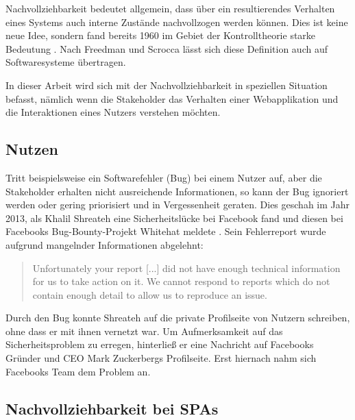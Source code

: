 Nachvollziehbarkeit bedeutet allgemein, dass über ein resultierendes Verhalten eines Systems auch interne Zustände nachvollzogen werden können. Dies ist keine neue Idee, sondern fand bereits 1960 im Gebiet der Kontrolltheorie starke Bedeutung \cite{OnTheGeneralTheoryOfControlSystems}. Nach Freedman \cite{TestabilityOfSoftwareComponents} und Scrocca \etal \cite{EnablingEventDrivenObservability} lässt sich diese Definition auch auf Softwaresysteme übertragen.
	
In dieser Arbeit wird sich mit der Nachvollziehbarkeit in speziellen Situation befasst, nämlich wenn die Stakeholder das Verhalten einer Webapplikation und die Interaktionen eines Nutzers verstehen möchten.%
	
\subsection{Nutzen}
	
Tritt beispielsweise ein Softwarefehler (Bug) bei einem Nutzer auf, aber die Stakeholder erhalten nicht ausreichende Informationen, so kann der Bug ignoriert werden oder gering priorisiert und in Vergessenheit geraten. Dies geschah im Jahr 2013, als Khalil Shreateh eine Sicherheitslücke bei Facebook fand und diesen bei Facebooks Bug-Bounty-Projekt Whitehat meldete \cite{FacebookBugBounyHunt}. Sein Fehlerreport wurde aufgrund mangelnder Informationen abgelehnt:
	
\begin{quotation}
Unfortunately your report [...] did not have enough technical information for us to take action  on  it. We  cannot  respond  to  reports  which  do  not contain enough detail to allow us to reproduce an issue.
\end{quotation}
	
Durch den Bug konnte Shreateh auf die private Profilseite von Nutzern schreiben, ohne dass er mit ihnen vernetzt war. Um Aufmerksamkeit auf das Sicherheitsproblem zu erregen, hinterließ er eine Nachricht auf Facebooks Gründer und CEO Mark Zuckerbergs Profilseite. Erst hiernach nahm sich Facebooks Team dem Problem an.
	
\subsection{Nachvollziehbarkeit bei SPAs}
	
